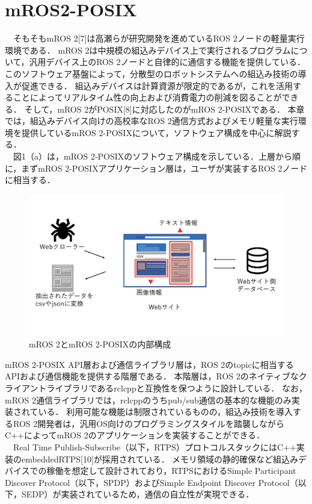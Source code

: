 \documentclass[11pt]{ujarticle}
\begin{document}
\section{mROS2-POSIX}
　そもそもmROS 2[7]は高瀬らが研究開発を進めているROS 2ノードの軽量実行環境である．
mROS 2は中規模の組込みデバイス上で実行されるプログラムについて，汎用デバイス上のROS 2ノードと自律的に通信する機能を提供している．
このソフトウェア基盤によって，分散型のロボットシステムへの組込み技術の導入が促進できる．
組込みデバイスは計算資源が限定的であるが，これを活用することによってリアルタイム性の向上および消費電力の削減を図ることができる．
そして，mROS 2がPOSIX[8]に対応したのがmROS 2-POSIXである．
本章では，組込みデバイス向けの高校率なROS 2通信方式およびメモリ軽量な実行環境を提供しているmROS 2-POSIXについて，ソフトウェア構成を中心に解説する．
\\　図1（a）は，mROS 2-POSIXのソフトウェア構成を示している．上層から順に，まずmROS 2-POSIXアプリケーション層は，ユーザが実装するROS 2ノードに相当する．
\begin{figure}[h]
	\includegraphics[width=0.9\linewidth]{./src/selenium.png}
	\caption{mROS 2とmROS 2-POSIXの内部構成}
  \label{fig:arch}
\end{figure}
mROS 2-POSIX API層および通信ライブラリ層は，ROS 2のtopicに相当するAPIおよび通信機能を提供する階層である．
本階層は，ROS 2のネイティブなクライアントライブラリであるrclcppと互換性を保つように設計している．
なお，mROS 2通信ライブラリでは，rclcppのうちpub/sub通信の基本的な機能のみ実装されている．
利用可能な機能は制限されているものの，組込み技術を導入するROS 2開発者は，汎用OS向けのプログラミングスタイルを踏襲しながらC++によってmROS 2のアプリケーションを実装することができる．
\\　Real Time Publish-Subscribe（以下，RTPS）プロトコルスタックにはC++実装のembeddedRTPS[10]が採用されている．
メモリ領域の静的確保など組込みデバイスでの稼働を想定して設計されており，RTPSにおけるSimple Participant Discover Protocol（以下，SPDP）およびSimple Endpoint Discover Protocol（以下，SEDP）が実装されているため，通信の自立性が実現できる．
\end{document}
